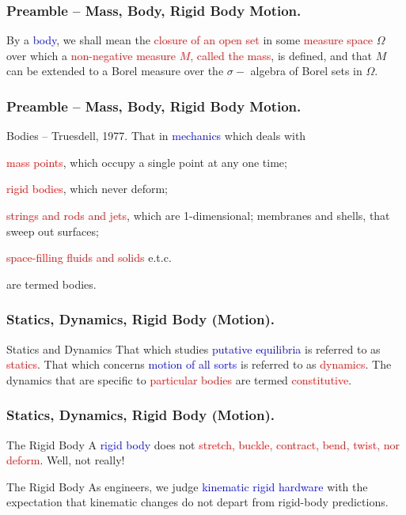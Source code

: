 \begin{frame}
	\frametitle{Preamble -- Mass, Body, Rigid Body Motion.}
	\begin{definition}
		By a \textcolor{blue}{body}, we shall mean the \textcolor{red}{closure of an open set} in some \textcolor{red}{measure space} $\Omega$ over which a \textcolor{red}{non-negative measure $M$, called the mass}, is defined, and that $M$ can be extended to a Borel measure over the $\sigma-$ algebra of Borel sets in $\Omega$.
	\end{definition}
\end{frame}

\begin{frame}
	\frametitle{Preamble -- Mass, Body, Rigid Body Motion.}
	\begin{block}{Bodies -- Truesdell, 1977.}
		That in \textcolor{blue}{mechanics} which deals with  \begin{inparaenum}[(i)]
			\item \textcolor{red}{mass points}, which occupy a single point at any one time;
			\item \textcolor{red}{rigid bodies}, which never deform;
			\item \textcolor{red}{strings and rods and jets}, which are 1-dimensional;  membranes and shells, that sweep out surfaces;
			\item \textcolor{red}{space-filling fluids and solids} e.t.c.
		\end{inparaenum}   
		are termed bodies.
	\end{block}
\end{frame}


\begin{frame}
	\frametitle{Statics, Dynamics, Rigid Body (Motion).}
	\begin{block}{Statics and Dynamics}
		That which studies \textcolor{blue}{putative equilibria} is referred to as  \textcolor{red}{statics}. That which concerns  \textcolor{blue}{motion of all sorts} is referred to as  \textcolor{red}{dynamics}. The dynamics that are specific to  \textcolor{red}{particular bodies} are termed  \textcolor{red}{constitutive}.
	\end{block}
\end{frame}


\begin{frame}
	\frametitle{Statics, Dynamics, Rigid Body (Motion).}
	\begin{block}{The Rigid Body}
		A \textcolor{blue}{rigid body} does not \textcolor{red}{stretch, buckle, contract, bend, twist, nor deform}. Well, not really!
	\end{block}
	\begin{block}{The Rigid Body}
		As engineers, we judge  \textcolor{blue}{kinematic rigid hardware} with the expectation that kinematic changes do not depart from rigid-body predictions.
	\end{block}
\end{frame}

